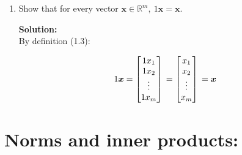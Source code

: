 \documentclass[]{article}
\newcommand{\solution}{\vskip 0.5cm \textbf{\large Solution:} \\}
\begin{document}
\begin{enumerate}
\item Show that for every vector $\bm{x}\in\mathbb{R}^m,~ 1\bm{x}=\bm{x}$.

  \solution
  By definition (1.3):

  \[
  1 \bm{x} =
  \begin{bmatrix}
    1 x_{1} \\
    1 x_{2} \\
    \vdots \\
    1 x_{m}
  \end{bmatrix} \\
  =
  \begin{bmatrix}
    x_{1} \\
    x_{2} \\
    \vdots \\
    x_{m}
  \end{bmatrix} \\
  = \bm{x}
  \]  

\end{enumerate}


\section*{Norms and inner products:}
\end{document}
